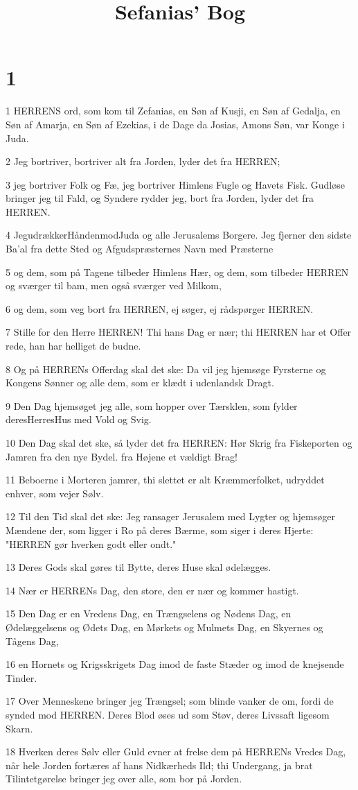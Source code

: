 

\title{Sefanias' Bog}


\chapter{1}

\par 1 HERRENS ord, som kom til Zefanias, en Søn af Kusji, en Søn af Gedalja, en Søn af Amarja, en Søn af Ezekias, i de Dage da Josias, Amons Søn, var Konge i Juda.
\par 2 Jeg bortriver, bortriver alt fra Jorden, lyder det fra HERREN;
\par 3 jeg bortriver Folk og Fæ, jeg bortriver Himlens Fugle og Havets Fisk. Gudløse bringer jeg til Fald, og Syndere rydder jeg, bort fra Jorden, lyder det fra HERREN.
\par 4 JegudrækkerHåndenmodJuda og alle Jerusalems Borgere. Jeg fjerner den sidste Ba'al fra dette Sted og Afgudspræsternes Navn med Præsterne
\par 5 og dem, som på Tagene tilbeder Himlens Hær, og dem, som tilbeder HERREN og sværger til bam, men også sværger ved Milkom,
\par 6 og dem, som veg bort fra HERREN, ej søger, ej rådspørger HERREN.
\par 7 Stille for den Herre HERREN! Thi hans Dag er nær; thi HERREN har et Offer rede, han har helliget de budne.
\par 8 Og på HERRENs Offerdag skal det ske: Da vil jeg hjemsøge Fyrsterne og Kongens Sønner og alle dem, som er klædt i udenlandsk Dragt.
\par 9 Den Dag hjemsøget jeg alle, som hopper over Tærsklen, som fylder deresHerresHus med Vold og Svig.
\par 10 Den Dag skal det ske, så lyder det fra HERREN: Hør Skrig fra Fiskeporten og Jamren fra den nye Bydel. fra Højene et vældigt Brag!
\par 11 Beboerne i Morteren jamrer, thi slettet er alt Kræmmerfolket, udryddet enhver, som vejer Sølv.
\par 12 Til den Tid skal det ske: Jeg ransager Jerusalem med Lygter og hjemsøger Mændene der, som ligger i Ro på deres Bærme, som siger i deres Hjerte: "HERREN gør hverken godt eller ondt."
\par 13 Deres Gods skal gøres til Bytte, deres Huse skal ødelægges.
\par 14 Nær er HERRENs Dag, den store, den er nær og kommer hastigt.
\par 15 Den Dag er en Vredens Dag, en Trængselens og Nødens Dag, en Ødelæggelsens og Ødets Dag, en Mørkets og Mulmets Dag, en Skyernes og Tågens Dag,
\par 16 en Hornets og Krigsskrigets Dag imod de faste Stæder og imod de knejsende Tinder.
\par 17 Over Menneskene bringer jeg Trængsel; som blinde vanker de om, fordi de synded mod HERREN. Deres Blod øses ud som Støv, deres Livssaft ligesom Skarn.
\par 18 Hverken deres Sølv eller Guld evner at frelse dem på HERRENs Vredes Dag, når hele Jorden fortæres af hans Nidkærheds Ild; thi Undergang, ja brat Tilintetgørelse bringer jeg over alle, som bor på Jorden.


